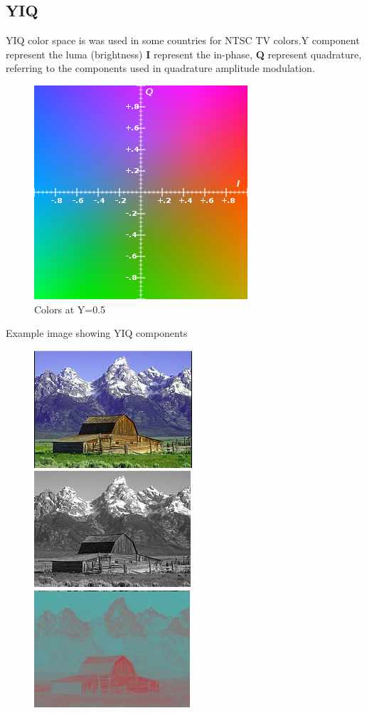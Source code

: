 \documentclass{article}
\begin{document}
\begin{multicols*}{2}
	\subsection*{YIQ}
	YIQ color space is was used in some countries for NTSC TV colors.Y component represent the luma (brightness\cite{10}) \textbf{I} represent the in-phase, \textbf{Q} represent quadrature, referring to the components used in quadrature amplitude modulation.\cite{11}
	\begin{figure}[H]
	\includegraphics[scale=0.5]{YIQ.png}
	\caption{Colors at Y=0.5}
	\end{figure}
Example image showing YIQ components
\begin{figure}[H]
\includegraphics[scale=0.5]{YIQALL.png}
\includegraphics[scale=0.5]{Y.png}
\includegraphics[scale=0.5]{I.png}

\end{figure}
\end{multicols*}
\end{document}

